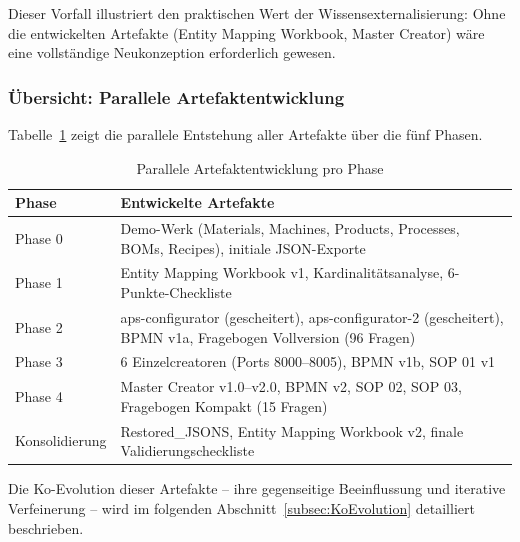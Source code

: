 Dieser Vorfall illustriert den praktischen Wert der Wissensexternalisierung: Ohne die entwickelten Artefakte (Entity Mapping Workbook, Master Creator) wäre eine vollständige Neukonzeption erforderlich gewesen.


\subsubsection{Übersicht: Parallele Artefaktentwicklung}
\label{subsubsec:ParalleleArtefakte}

Tabelle~\ref{tab:ParalleleArtefakte} zeigt die parallele Entstehung aller Artefakte über die fünf Phasen.

\begin{table}[h]
\centering
\caption{Parallele Artefaktentwicklung pro Phase}
\label{tab:ParalleleArtefakte}
\begin{tabular}{lp{9cm}}
\hline
\textbf{Phase} & \textbf{Entwickelte Artefakte} \\
\hline
Phase 0 & Demo-Werk (Materials, Machines, Products, Processes, BOMs, Recipes), initiale JSON-Exporte \\
Phase 1 & Entity Mapping Workbook v1, Kardinalitätsanalyse, 6-Punkte-Checkliste \\
Phase 2 & aps-configurator (gescheitert), aps-configurator-2 (gescheitert), BPMN v1a, Fragebogen Vollversion (96 Fragen) \\
Phase 3 & 6 Einzelcreatoren (Ports 8000--8005), BPMN v1b, SOP 01 v1 \\
Phase 4 & Master Creator v1.0--v2.0, BPMN v2, SOP 02, SOP 03, Fragebogen Kompakt (15 Fragen) \\
Konsolidierung & Restored\_JSONS, Entity Mapping Workbook v2, finale Validierungscheckliste \\
\hline
\end{tabular}
\end{table}

Die Ko-Evolution dieser Artefakte -- ihre gegenseitige Beeinflussung und iterative Verfeinerung -- wird im folgenden Abschnitt~\ref{subsec:KoEvolution} detailliert beschrieben.

